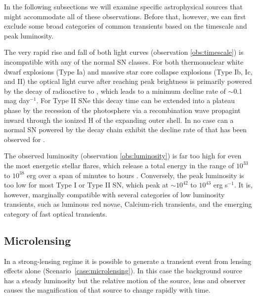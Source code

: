 \noindent In the following subsections we will examine specific
astrophysical sources that might accommodate all of these
observations. Before that, however, we can first exclude some broad
categories of common transients based on the timescale and peak
luminosity.

The very rapid rise and fall of both light curves (observation
\ref{obs:timescale}) is incompatible with any of the normal SN
classes.  For both thermonuclear white dwarf explosions (Type Ia) and
massive star core collapse explosions (Type Ib, Ic, and II) the
optical light curve after reaching peak brightness is primarily
powered by the decay of radioactive \NiFiftySix to \CoFiftySix, which
leads to a minimum decline rate of $\sim$0.1 mag day$^{-1}$.  For Type
II SNe this decay time can be extended into a plateau phase by the
recession of the photosphere via a recombination wave propagint inward
through the ionized H of the expanding outer shell.  In no case can a
normal SN powered by the \NiFiftySix decay chain exhibit the decline
rate of  that has been
observed for \spock.

The observed luminosity (observation \ref{obs:luminosity}) is far too
high for even the most energetic stellar flares, which release a total
energy in the range of $10^{33}$ to $10^{38}$ erg over a span of
minutes to hours \citep{Balona:2012,Karoff:2016}.  Conversely, the
peak luminosity is too low for most Type I or Type II SN, which peak
at $\sim10^{42}$ to $10^{43}$ erg s$^{-1}$.  It is, however, marginally
compatible with several categories of low luminosity transients, such
as luminous red novae, Calcium-rich transients, and the emerging
category of fast optical transients.








\subsection{Microlensing}

In a strong-lensing regime it is possible to generate a transient
event from lensing effects alone (Scenario~\ref{case:microlensing}).
In this case the background source has a steady luminosity but the
relative motion of the source, lens and observer causes the
magnification of that source to change rapidly with time.

